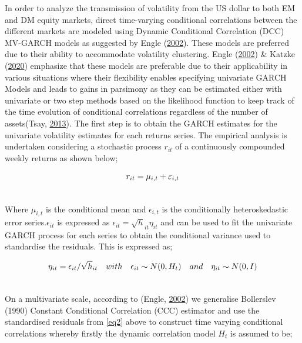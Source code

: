 \documentclass[11pt,preprint, authoryear]{elsarticle}
\numberwithin{equation}{section}
\numberwithin{figure}{section}
\numberwithin{table}{section}
\begin{document}
In order to analyze the transmission of volatility from the US dollar to
both EM and DM equity markets, direct time-varying conditional
correlations between the different markets are modeled using Dynamic
Conditional Correlation (DCC) MV-GARCH models as suggested by Engle
(\protect\hyperlink{ref-engle2002}{2002}). These models are preferred
due to their ability to accommodate volatility clustering. Engle
(\protect\hyperlink{ref-engle2002}{2002}) \& Katzke
(\protect\hyperlink{ref-katzke2020}{2020}) emphasize that these models
are preferable due to their applicability in various situations where
their flexibility enables specifying univariate GARCH Models and leads
to gains in parsimony as they can be estimated either with univariate or
two step methods based on the likelihood function to keep track of the
time evolution of conditional correlations regardless of the number of
assets(Tsay, \protect\hyperlink{ref-tsay2013}{2013}). The first step is
to obtain the GARCH estimates for the univariate volatility estimates
for each returns series. The empirical analysis is undertaken
considering a stochastic process \(r_{it}\) of a continuously compounded
weekly returns as shown below;

\begin{align}
r_{it} = \mu_{i,t} + \varepsilon_{i,t}  \label{eq1} \\ \notag 
\end{align}

Where \(\mu_{i,t}\) is the conditional mean and \(\epsilon_{i,t}\) is
the conditionally heteroskedastic error series.\(\epsilon_{it}\) is
expressed as \(\epsilon_{it}= \sqrt h_{it} \eta_{it}\) and can be used
to fit the univariate GARCH process for each series to obtain the
conditional variance used to standardise the residuals. This is
expressed as;

\begin{align}
\eta_{it}= \epsilon_{it}/ \sqrt h_{it} \quad with \quad \epsilon_{it} \sim N(0,H_t)\quad and\quad \eta_{it} \sim N(0,I)   \label{eq2} \\ \notag 
\end{align}

On a multivariate scale, according to (Engle,
\protect\hyperlink{ref-engle2002}{2002}) we generalise Bollerslev (1990)
Constant Conditional Correlation (CCC) estimator and use the
standardised residuals from \ref{eq2} above to construct time varying
conditional correlations whereby firstly the dynamic correlation model
\(H_t\) is assumed to be;
\end{document}
